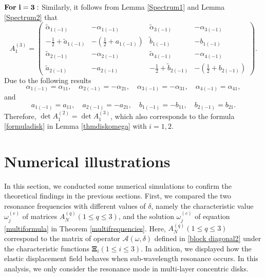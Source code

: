 \documentclass[10pt,reqno,oneside]{amsart}%
\theoremstyle{definition}
\theoremstyle{remark}
\numberwithin{equation}{section}
\numberwithin{equation}{section}
\begin{document}
$\bf{For \ i=3:}$ Similarly, it follows from Lemma \ref{Spectrum1} and Lemma \ref{Spectrum2} that
\begin{equation}\label{A3}
A_1^{(3)}=
\begin{pmatrix}
\tilde{\alpha}_{1(-1)} & -{\alpha}_{1(-1)}&  \tilde{\alpha}_{3(-1)}&  - {\alpha}_{3(-1)}\\
-\frac{1}{2}+\tilde{a}_{1(-1)}  &-(\frac{1}{2}+a_{1(-1)}) & \tilde{b}_{1(-1)}  & -{b}_{1(-1)}\\
\tilde{\alpha}_{2(-1)} & -{\alpha}_{2(-1)}&  \tilde{\alpha}_{4(-1)}&  - {\alpha}_{4(-1)}\\
\tilde{a}_{2(-1)}& -{a}_{2(-1)}&  -\frac{1}{2}+\tilde{b}_{2(-1)}&-(\frac{1}{2}+b_{2(-1)})
\end{pmatrix}.%
\end{equation}
Due to the following results
$$
{\alpha}_{1(-1)}={\alpha}_{11},\quad {\alpha}_{2(-1)}=-{\alpha}_{21},\quad {\alpha}_{3(-1)}=-{\alpha}_{31},\quad {\alpha}_{4(-1)}={\alpha}_{41},
$$
and
$$
a_{1(-1)}=a_{11},\quad a_{2(-1)}=-a_{21},\quad b_{1(-1)}=-b_{11},\quad b_{2(-1)}=b_{21}.
$$
Therefore, $\det A_1^{(2)}=\det A_1^{(3)}$, which also corresponds to the formula \eqref{formuladisk} in Lemma \ref{thmdiskomega} with $i=1,2$.

\section{Numerical illustrations}In this section, we conducted some numerical simulations to confirm the theoretical findings in the previous sections. First, we compared the two resonance frequencies with different values of $\delta$, namely the characteristic value $\omega_j^{(e)}$ of matrices $A_N^{(q)}(1\leq q\leq3)$, and the solution $\omega_j^{(c)}$ of equation \eqref{multiformula} in Theorem \ref{multifrequencies}. Here, $A_N^{(q)}(1\leq q\leq3)$ correspond to the matrix of operator $\mathcal{A}(\omega,\delta)$ defined in \eqref{block diagonal2} under the characteristic functions $\boldsymbol{\Xi}_i(1\leq i\leq3)$. In addition, we displayed how the elastic displacement field behaves when sub-wavelength resonance occurs. In this analysis, we only consider the resonance mode in multi-layer concentric disks.
\end{document}
